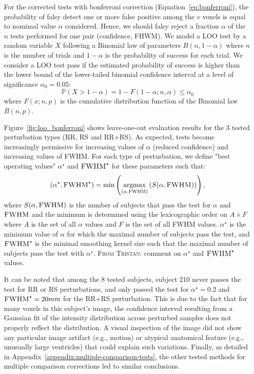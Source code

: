 \documentclass{article}
\newcommand{\TG}[1]{\color{blue}\textsc{From Tristan:} #1\color{black}\xspace}
\newcommand{\fwhm}{\textsc{FWHM}}
\begin{document}
For the corrected tests with bonferroni correction
(Equation~\ref{eq:bonferroni}), the probability of falsy detect one or more
false positive among the $v$ voxels is equal to nomimal value $\alpha$
considered. Hence, we should falsy reject a fraction $\alpha$ of the $n$ tests
performed for one pair (confidence, FHWM). We model a LOO test
by a random variable $X$ following a Binomial law of
parameters $B(n,1-\alpha)$ where $n$ is the number of trials and $1-\alpha$ is
the probability of success for each trial. We consider a LOO test pass if the
estimated probability of success is higher than the lower bound of the
lower-tailed binomial confidence interval at a level of significance
$\alpha_0=0.05$:
\[
    \mathbb{P}(X > 1-\alpha) = 1 - F(1-\alpha;n,\alpha) \leq \alpha_0
\]
where $F(x;n,p)$ is the cumulative distribution function of the Binomial law $B(n,p)$.


Figure~\ref{fig:loo_bonferroni} shows leave-one-out evaluation results
for the 3 tested perturbation types (RR, RS and RR+RS). As expected, tests
become increasingly permissive for increasing values of $\alpha$ (reduced
confidence) and increasing values of FWHM. For each type of perturbation, we
define "best operating values" $\alpha^\star$ and $\fwhm^\star$ for these parameters
such that:
\begin{equation}
    (\alpha^\star, \fwhm^\star) = \min\left(\underset{(\alpha, \fwhm)}{\mathrm{argmax}}\left( S(\alpha,\fwhm)\right)\right),
\end{equation}
where $S(\alpha, \fwhm)$ is the number of subjects that pass the test for
$\alpha$ and $\fwhm$ and the minimum is determined using the lexicographic
order on $A \times F$ where $A$ is the set of all $\alpha$ values and $F$ is the
set of all FWHM values. $\alpha^\star$ is the minimum value of $\alpha$ for which
the maximal number of subjects pass the test, and $\fwhm^\star$ is the minimal
smoothing kernel size such that the maximal number of subjects pass the test
with $\alpha^\star$. \TG{comment on $\alpha^\star$ and $\fwhm^\star$ values.}


It can be
noted that among the 8 tested subjects, subject 210 never passes the test for RR
or RS perturbations, and only passed the test for $\alpha^\star=0.2$ and
$\fwhm^\star=20mm$ for the RR+RS perturbation. This is due to the fact that for
many voxels in this subject's image, the confidence interval resulting from a
Gaussian fit of the intensity distribution across perturbed samples does not
properly reflect the distribution. A visual inspection of the image did not
show any particular image artifact (e.g., motion) or atypical anatomical feature
(e.g., unusually large ventricles) that could explain such variations. Finally,
as detailed in Appendix~\ref{appendix:multiple-comparison-tests}, the other
tested methods for multiple comparison corrections led to similar conclusions.
\end{document}
